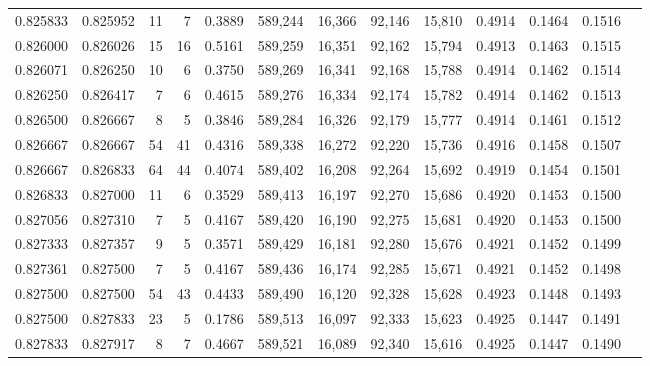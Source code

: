 \begin{tabular}{rrrrrrrrrrrrr}
0.825833 & 0.825952 &    11 &   7 &                                     0.3889 & 589,244 &  16,366 &  92,146 &  15,810 & 0.4914 & 0.1464 & 0.1516 \\
0.826000 & 0.826026 &    15 &  16 &                                     0.5161 & 589,259 &  16,351 &  92,162 &  15,794 & 0.4913 & 0.1463 & 0.1515 \\
0.826071 & 0.826250 &    10 &   6 &                                     0.3750 & 589,269 &  16,341 &  92,168 &  15,788 & 0.4914 & 0.1462 & 0.1514 \\
0.826250 & 0.826417 &     7 &   6 &                                     0.4615 & 589,276 &  16,334 &  92,174 &  15,782 & 0.4914 & 0.1462 & 0.1513 \\
0.826500 & 0.826667 &     8 &   5 &                                     0.3846 & 589,284 &  16,326 &  92,179 &  15,777 & 0.4914 & 0.1461 & 0.1512 \\
0.826667 & 0.826667 &    54 &  41 &                                     0.4316 & 589,338 &  16,272 &  92,220 &  15,736 & 0.4916 & 0.1458 & 0.1507 \\
0.826667 & 0.826833 &    64 &  44 &                                     0.4074 & 589,402 &  16,208 &  92,264 &  15,692 & 0.4919 & 0.1454 & 0.1501 \\
0.826833 & 0.827000 &    11 &   6 &                                     0.3529 & 589,413 &  16,197 &  92,270 &  15,686 & 0.4920 & 0.1453 & 0.1500 \\
0.827056 & 0.827310 &     7 &   5 &                                     0.4167 & 589,420 &  16,190 &  92,275 &  15,681 & 0.4920 & 0.1453 & 0.1500 \\
0.827333 & 0.827357 &     9 &   5 &                                     0.3571 & 589,429 &  16,181 &  92,280 &  15,676 & 0.4921 & 0.1452 & 0.1499 \\
0.827361 & 0.827500 &     7 &   5 &                                     0.4167 & 589,436 &  16,174 &  92,285 &  15,671 & 0.4921 & 0.1452 & 0.1498 \\
0.827500 & 0.827500 &    54 &  43 &                                     0.4433 & 589,490 &  16,120 &  92,328 &  15,628 & 0.4923 & 0.1448 & 0.1493 \\
0.827500 & 0.827833 &    23 &   5 &                                     0.1786 & 589,513 &  16,097 &  92,333 &  15,623 & 0.4925 & 0.1447 & 0.1491 \\
0.827833 & 0.827917 &     8 &   7 &                                     0.4667 & 589,521 &  16,089 &  92,340 &  15,616 & 0.4925 & 0.1447 & 0.1490 \\

\end{tabular}
